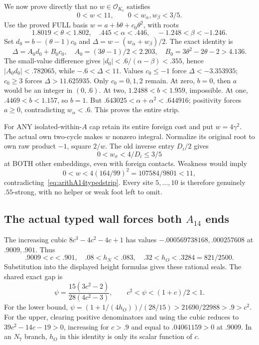 \documentclass[11pt]{article}
\begin{document}
We now prove directly that no
\(w\in\mathcal O_{K_7}\) satisfies
\[
                    0<w<11,\qquad0<w_\alpha,w_\beta<3/5 .
\tag{A14strip}\label{eq:arithA14typedstrip}
\]
Use the proved FULL basis
\(w=a+b\theta+c_0\theta^2\), with roots
\[
 1.8019<\theta<1.802,\quad .445<\alpha<.446,\quad
                            -1.248<\beta<-1.246 .
\]
Set \(d_0=b-(\theta-1)c_0\) and
\(\Delta=w-(w_\alpha+w_\beta)/2\).
The exact identity is
\[
 \Delta=A_0d_0+B_0c_0,\quad
 A_0=(3\theta-1)/2<2.203,\quad
 B_0=3\theta^2-2\theta-2>4.136 .
\]
The small-value difference gives
\(|d_0|<.6/(\alpha-\beta)<.355\),
hence \(|A_0d_0|<.782065\), while
\(-.6<\Delta<11\).
Values \(c_0\le-1\) force
\(\Delta<-3.353935\);
\(c_0\ge3\) forces \(\Delta>11.625935\).
Only \(c_0=0,1,2\) remain.
At zero, \(b=0\), then \(a\) would be an
integer in \((0,.6)\).
At two, \(1.2488<b<1.959\), impossible.
At one, \(.4469<b<1.157\), so \(b=1\).
But \(.643025<\alpha+\alpha^2<.644916\);
positivity forces \(a\ge0\), contradicting
\(w_\alpha<.6\).
This proves the entire strip.

For ANY isolated-within-\(A\) cap retain
its entire foreign cost and put \(w=4\gamma^2\).
The actual own two-cycle makes \(w\)
nonzero integral.
Normalize its original root to own raw
product \(-1\), square \(2/w\).
The old inverse entry \(D_i/2\) gives
\[
                     0<w_\sigma<4/D_i\le3/5
\]
at BOTH other embeddings, even with
foreign contacts.
Weakness would imply
\[
           0<w<4(164/99)^2=107584/9801<11,
\]
contradicting~\eqref{eq:arithA14typedstrip}.
Every site \(5,\ldots,10\) is therefore
genuinely \(.55\)-strong, with no helper
or weak foot left to omit.

\subsection[The actual typed wall forces both A14 ends]{The actual typed wall forces both \(A_{14}\) ends}
\label{app:arithA14typedends}

The increasing cubic \(8c^3-4c^2-4c+1\)
has values \(-.000569738168,.000257608\)
at \(.9009,.901\).
Thus
\[
 .9009<c<.901,\quad
 .08<h_N<.083,\quad .32<h_O<.3284=821/2500 .
\]
Substitution into the displayed height
formulas gives these rational seals.
The shared exact gap is
\[
 \psi={\frac{15(3c^2-2)}{28(4c^2-3)}},\qquad
                         c^2<\psi<(1+c)/2<1 .
\tag{A14gap}\label{eq:arithA14typedgap}
\]
For the lower bound,
\(\psi=(1+1/(4h_O))/(28/15)>21690/22988>.9>c^2\).
For the upper, clearing positive denominators
and using the cubic reduces to
\(39c^2-14c-19>0\), increasing for \(c>.9\)
and equal to \(.04061159>0\) at \(.9009\).
In an \(N_7\) branch, \(h_O\) in this
identity is only its scalar function of \(c\).
\end{document}
